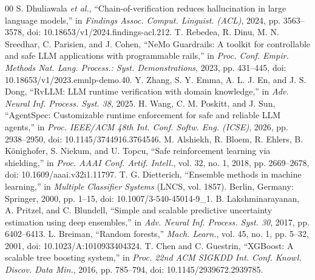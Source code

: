 \documentclass[conference]{IEEEtran}
\begin{document}
\begin{thebibliography}{00}
 S. Dhuliawala \textit{et al.}, ``Chain-of-verification reduces hallucination in large language models,'' in \textit{Findings Assoc. Comput. Linguist. (ACL)}, 2024, pp. 3563--3578, doi: 10.18653/v1/2024.findings-acl.212.
 T. Rebedea, R. Dinu, M. N. Sreedhar, C. Parisien, and J. Cohen, ``NeMo Guardrails: A toolkit for controllable and safe LLM applications with programmable rails,'' in \textit{Proc. Conf. Empir. Methods Nat. Lang. Process.: Syst. Demonstrations}, 2023, pp. 431--445, doi: 10.18653/v1/2023.emnlp-demo.40.
 Y. Zhang, S. Y. Emma, A. L. J. En, and J. S. Dong, ``RvLLM: LLM runtime verification with domain knowledge,'' in \textit{Adv. Neural Inf. Process. Syst. 38}, 2025.
 H. Wang, C. M. Poskitt, and J. Sun, ``AgentSpec: Customizable runtime enforcement for safe and reliable LLM agents,'' in \textit{Proc. IEEE/ACM 48th Int. Conf. Softw. Eng. (ICSE)}, 2026, pp. 2938--2950, doi: 10.1145/3744916.3764546.
 M. Alshiekh, R. Bloem, R. Ehlers, B. K\"{o}nighofer, S. Niekum, and U. Topcu, ``Safe reinforcement learning via shielding,'' in \textit{Proc. AAAI Conf. Artif. Intell.}, vol. 32, no. 1, 2018, pp. 2669--2678, doi: 10.1609/aaai.v32i1.11797.
 T. G. Dietterich, ``Ensemble methods in machine learning,'' in \textit{Multiple Classifier Systems} (LNCS, vol. 1857). Berlin, Germany: Springer, 2000, pp. 1--15, doi: 10.1007/3-540-45014-9\_1.
 B. Lakshminarayanan, A. Pritzel, and C. Blundell, ``Simple and scalable predictive uncertainty estimation using deep ensembles,'' in \textit{Adv. Neural Inf. Process. Syst. 30}, 2017, pp. 6402--6413.
 L. Breiman, ``Random forests,'' \textit{Mach. Learn.}, vol. 45, no. 1, pp. 5--32, 2001, doi: 10.1023/A:1010933404324.
 T. Chen and C. Guestrin, ``XGBoost: A scalable tree boosting system,'' in \textit{Proc. 22nd ACM SIGKDD Int. Conf. Knowl. Discov. Data Min.}, 2016, pp. 785--794, doi: 10.1145/2939672.2939785.
\end{thebibliography}
\end{document}
